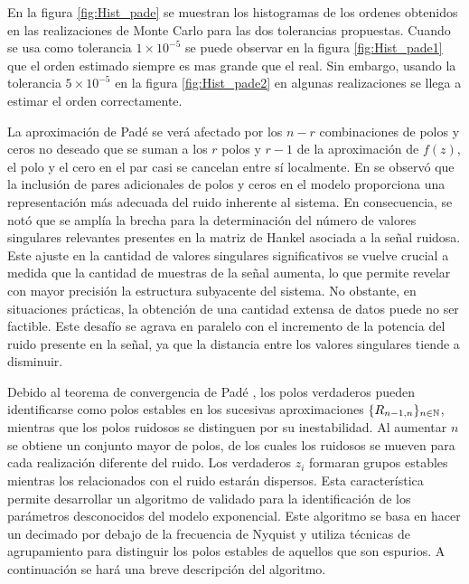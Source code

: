 	En la figura \ref{fig:Hist_pade} se muestran los histogramas de los ordenes obtenidos en las realizaciones de Monte Carlo para las dos tolerancias propuestas. Cuando se usa como tolerancia $1\times 10^{-5}$ se puede observar en la figura \ref{fig:Hist_pade1} que el orden estimado siempre es mas grande que el real. Sin embargo, usando la tolerancia $5\times 10^{-5}$ en la figura \ref{fig:Hist_pade2} en algunas realizaciones se llega a estimar el orden correctamente.
	
	
	La aproximación de Padé se verá afectado por los $n-r$ combinaciones de polos y ceros no deseado que se suman a los $r$ polos y $r-1$ de la aproximación de $f(z)$, el polo y el cero en el par casi se cancelan entre sí localmente. En \cite{Cuyt2018} se observó que la inclusión de pares adicionales de polos y ceros en el modelo proporciona una representación más adecuada del ruido inherente al sistema. En consecuencia, se notó que se amplía la brecha para la determinación del número de valores singulares relevantes presentes en la matriz de Hankel asociada a la señal ruidosa. Este ajuste en la cantidad de valores singulares significativos se vuelve crucial a medida que la cantidad de muestras de la señal aumenta, lo que permite revelar con mayor precisión la estructura subyacente del sistema. No obstante, en situaciones prácticas, la obtención de una cantidad extensa de datos puede no ser factible. Este desafío se agrava en paralelo con el incremento de la potencia del ruido presente en la señal, ya que la distancia entre los valores singulares tiende a disminuir.
	
	Debido al teorema de convergencia de Padé \cite{NUTTALL1970}, los polos verdaderos pueden identificarse como polos estables en los sucesivas aproximaciones $\{R_{n-1,n}\}_{n\in\mathbb{N}}$, mientras que los polos ruidosos se distinguen por su inestabilidad. Al aumentar $n$ se obtiene un conjunto mayor de polos, de los cuales los ruidosos se mueven para cada realización diferente del ruido. Los verdaderos $z_i$ formaran grupos estables mientras los relacionados con el ruido estarán dispersos. Esta característica permite desarrollar un algoritmo de validado \cite{BRIANI2020} para la identificación de los parámetros desconocidos del modelo exponencial. Este algoritmo se basa en hacer un decimado por debajo de la frecuencia de Nyquist y utiliza técnicas de agrupamiento para distinguir los polos estables de aquellos que son espurios. A continuación se hará una breve descripción del algoritmo.
	 
	 
	
